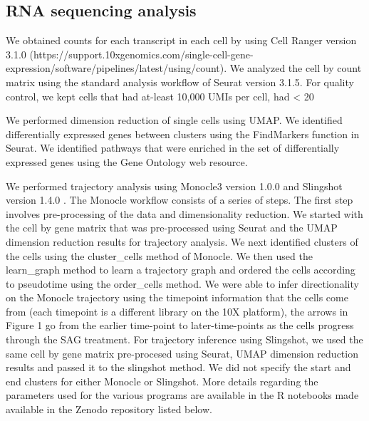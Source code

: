 \subsection{RNA sequencing analysis}
We obtained counts for each transcript in each cell by using Cell Ranger version 3.1.0 (https://support.10xgenomics.com/single-cell-gene-expression/software/pipelines/latest/using/count).  We analyzed the cell by count matrix using the standard analysis workflow of Seurat version 3.1.5.\cite{Butler2018-jc,Stuart2019-ra} For quality control, we kept cells that had at-least 10,000 UMIs per cell, had < 20 %

We performed dimension reduction of single cells using UMAP\cite{McInnes2018-sm}. We identified differentially expressed genes between clusters using the FindMarkers function in Seurat.  We identified pathways that were enriched in the set of differentially expressed genes using the Gene Ontology web resource\cite{Ashburner2000-id,Mi2019-pi,Gene_Ontology_Consortium2021-mx}.

We performed trajectory analysis using Monocle3 version 1.0.0\cite{Trapnell2014-ho,Qiu2017-uz} and Slingshot version 1.4.0 \cite{Street2018-ak}. The Monocle workflow consists of a series of steps. The first step involves pre-processing of the data and dimensionality reduction. We started with the cell by gene matrix that was pre-processed using Seurat and the UMAP dimension reduction results for trajectory analysis. We next identified clusters of the cells using the cluster\_cells method of Monocle. We then used the learn\_graph method to learn a trajectory graph and ordered the cells according to pseudotime using the order\_cells method. We were able to infer directionality on the Monocle trajectory using the timepoint information that the cells come from (each timepoint is a different library on the 10X platform), the arrows in Figure 1 go from the earlier time-point to later-time-points as the cells progress through the SAG treatment. For trajectory inference using Slingshot, we used the same cell by gene matrix pre-procesed using Seurat, UMAP dimension reduction results and passed it to the slingshot method. We did not specify the start and end clusters for either Monocle or Slingshot.  More details regarding the parameters used for the various programs are available in the R notebooks made available in the Zenodo repository listed below. 


